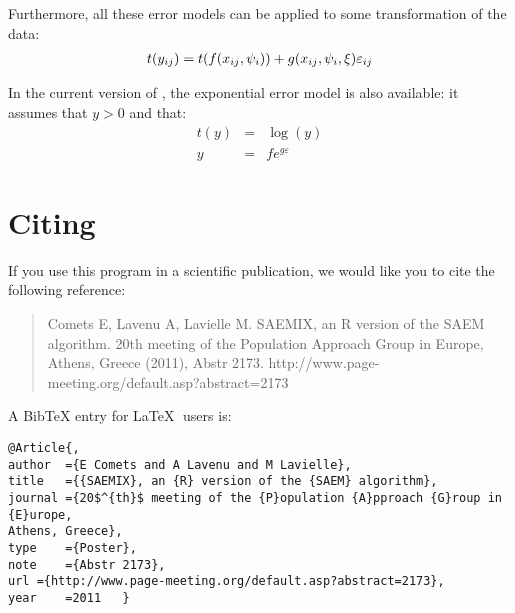 Furthermore, all these error models can be applied to some transformation of the data:
\begin{eqnarray}\label{def_t}
t(y_{ij})=t(f(x_{ij},{\psi_i}))+ g(x_{ij},{\psi_i},\xi)\varepsilon_{ij}
\end{eqnarray}

In the current version of \monolix, the exponential error model is also available: it assumes that $y>0$ and that:
\begin{eqnarray*}
t(y) &=& \log(y) \\
y&=&f e^{g\varepsilon}
\end{eqnarray*}

\section{Citing \monolix}

\hskip 18pt If you use this program in a scientific publication, we would like
you to cite the following reference:
\begin{quotation}
\noindent 
Comets E, Lavenu A, Lavielle M. SAEMIX, an R version of the SAEM algorithm. 20th meeting of the Population Approach Group in Europe, Athens, Greece (2011), Abstr 2173. http://www.page-meeting.org/default.asp?abstract=2173
\end{quotation}

A BibTeX entry for \LaTeX$\;$ users is:
\begin{verbatim}
@Article{,
author	={E Comets and A Lavenu and M Lavielle},
title	={{SAEMIX}, an {R} version of the {SAEM} algorithm},
journal	={20$^{th}$ meeting of the {P}opulation {A}pproach {G}roup in {E}urope,
Athens, Greece},
type	={Poster},
note	={Abstr 2173},
url	={http://www.page-meeting.org/default.asp?abstract=2173},
year	=2011	}
\end{verbatim}
